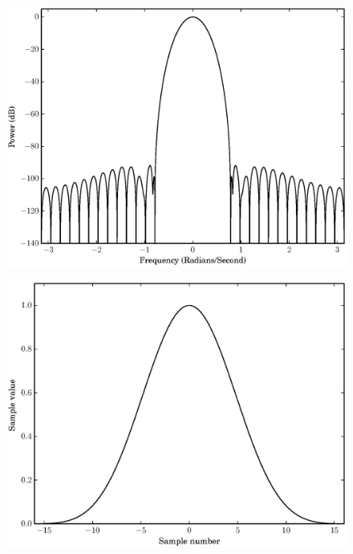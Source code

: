 \begin{figure}[!t]
    \caption{}
    \centering
    \includegraphics[width=\figwidthscale\textwidth]{plots/min4_blackman_fd.eps}
    \CaptionWithTitle{%
    }{}
\end{figure}

\begin{figure}[!t]
    \caption{}
    \centering
    \includegraphics[width=\figwidthscale\textwidth]{plots/c1_blackman_td.eps}
    \CaptionWithTitle{%
    }{}
\end{figure}

